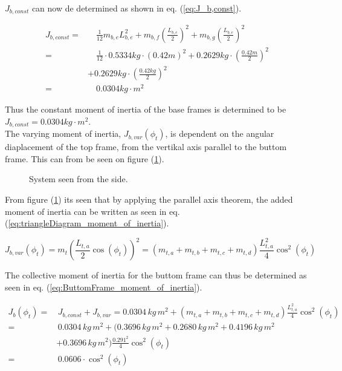 \documentclass[../../main]{subfiles}
\begin{document}
$J_{b,const}$ can now de determined as shown in eq. (\ref{eq:J_b,const}).

\begin{equation}
  \label{eq:J_b,const}
  \begin{split}
      J_{b,const} =& \quad \frac{1}{12}m_{b,e}L_{b,e}^2 + m_{b,f} \left( \frac{L_{b,e}}{2} \right)^2 + m_{b,g}\left(\frac{L_{b,e}}{2}\right)^2\\
      =& \quad \frac{1}{12} \cdot 0.5334\si{kg} \cdot (0.42 \si{m})^2 + 0.2629\si{kg} \cdot \left( \frac{0.42 \si{m}}{2} \right)^2 \\
      &+ 0.2629 \si{kg}\cdot \left(\frac{0.42 \si{kg}}{2}\right)^2\\
      =& \quad 0.0304 \si{kg\cdot m^2}
  \end{split}
\end{equation}

Thus the constant moment of inertia of the base frames is determined to be $J_{b,const} = 0.0304 \si{kg\cdot m^2}$.
\\
The varying moment of inertia, $J_{b,var}(\phi_t)$, is dependent on the angular diaplacement of the top frame, from the vertikal axis parallel to the buttom frame. This can from be seen on figure (\ref{fig:TrekantDiagram}).

\begin{figure}[H]
  \label{fig:TrekantDiagram}
  \centering
  \def\svgwidth{0.4\columnwidth}
  
  \caption{System seen from the side.}
\end{figure}

From figure (\ref{fig:TrekantDiagram}) its seen that by applying the parallel axis theorem, the added moment of inertia can be written as seen in eq. (\ref{eq:triangleDiagram_moment_of_inertia}).

\begin{equation}
  \label{eq:triangleDiagram_moment_of_inertia}
  J_{b,var}(\phi_t) = m_{t} \left( \frac{L_{t,a}}{2} \cos(\phi_t) \right)^2 = ( m_{t,a} + m_{t,b} + m_{t,c} + m_{t,d} ) \frac{L_{t,a}^2}{4} \cos^2(\phi_t)
\end{equation}

The collective moment of inertia for the buttom frame can thus be determined as seen in eq. (\ref{eq:ButtomFrame_moment_of_inertia}).

\begin{equation}
  \label{eq:ButtomFrame_moment_of_inertia}
\begin{split}
    J_b(\phi_t) =& \, J_{b,const} + J_{b,var} = 0.0304 \si{\, kg \, m^2} + ( m_{t,a} + m_{t,b} + m_{t,c} + m_{t,d} ) \frac{L_{t,a}^2}{4} \cos^2(\phi_t)\\
    =& \, 0.0304 \si{\, kg \, m^2} + ( 0.3696 \si{\, kg \, m^2} + 0.2680 \si{\, kg \, m^2} + 0.4196 \si{\, kg \, m^2}\\
    &+ 0.3696 \si{\, kg \, m^2})\frac{0.291^2}{4}\cos^2(\phi_t)\\
    =& \, 0.0606\cdot \cos^2(\phi_t)
\end{split}
\end{equation}
\end{document}
